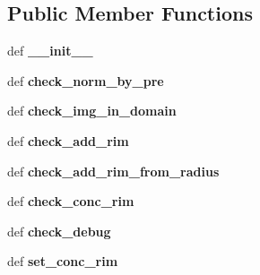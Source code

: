 \subsection*{Public Member Functions}
\begin{DoxyCompactItemize}
\item 
\hypertarget{classpyfrp__subwin_1_1analysis__dialog_aa3d0436cc0d7e95f1636aea80ec5f86f}{def {\bfseries \+\_\+\+\_\+init\+\_\+\+\_\+}}\label{classpyfrp__subwin_1_1analysis__dialog_aa3d0436cc0d7e95f1636aea80ec5f86f}

\item 
\hypertarget{classpyfrp__subwin_1_1analysis__dialog_a67f4caa5a7de12e4aa65d21e9b2b7259}{def {\bfseries check\+\_\+norm\+\_\+by\+\_\+pre}}\label{classpyfrp__subwin_1_1analysis__dialog_a67f4caa5a7de12e4aa65d21e9b2b7259}

\item 
\hypertarget{classpyfrp__subwin_1_1analysis__dialog_ab6821318dbbc773688becd7e5aa3ea68}{def {\bfseries check\+\_\+img\+\_\+in\+\_\+domain}}\label{classpyfrp__subwin_1_1analysis__dialog_ab6821318dbbc773688becd7e5aa3ea68}

\item 
\hypertarget{classpyfrp__subwin_1_1analysis__dialog_ab377191d3be502dbec6fc20d81cd1780}{def {\bfseries check\+\_\+add\+\_\+rim}}\label{classpyfrp__subwin_1_1analysis__dialog_ab377191d3be502dbec6fc20d81cd1780}

\item 
\hypertarget{classpyfrp__subwin_1_1analysis__dialog_a279a1cd762c69bef256b1adaea856ad2}{def {\bfseries check\+\_\+add\+\_\+rim\+\_\+from\+\_\+radius}}\label{classpyfrp__subwin_1_1analysis__dialog_a279a1cd762c69bef256b1adaea856ad2}

\item 
\hypertarget{classpyfrp__subwin_1_1analysis__dialog_a226810999aaa1043948ca95cd080f401}{def {\bfseries check\+\_\+conc\+\_\+rim}}\label{classpyfrp__subwin_1_1analysis__dialog_a226810999aaa1043948ca95cd080f401}

\item 
\hypertarget{classpyfrp__subwin_1_1analysis__dialog_a78711f1534ef1b91f95945424cb6c3ba}{def {\bfseries check\+\_\+debug}}\label{classpyfrp__subwin_1_1analysis__dialog_a78711f1534ef1b91f95945424cb6c3ba}

\item 
\hypertarget{classpyfrp__subwin_1_1analysis__dialog_a3b5a2ef16ebc05b4a85162aaa140ec19}{def {\bfseries set\+\_\+conc\+\_\+rim}}\label{classpyfrp__subwin_1_1analysis__dialog_a3b5a2ef16ebc05b4a85162aaa140ec19}


\end{DoxyCompactItemize}
